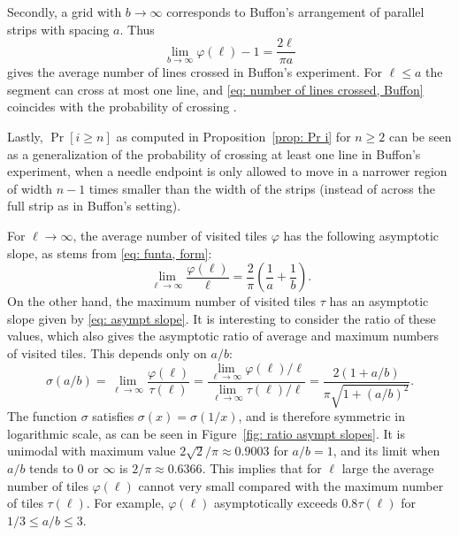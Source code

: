 \documentclass[12pt, a4paper]{article}
\newcommand{\funt}{\tau} %
\newcommand{\funta}{\varphi} %
\newcommand{\ras}{\sigma}
\newcommand{\len}{\ell} %
\begin{document}
Secondly, a grid with $b \rightarrow \infty$ corresponds to Buffon's arrangement of parallel strips with spacing $a$. Thus
\begin{equation}
\label{eq: number of lines crossed, Buffon}
\lim_{b \rightarrow \infty} \funta(\len)-1 = \frac{2\len}{\pi a}
\end{equation}
gives the average number of lines crossed in Buffon's experiment. For $\len \leq a$ the segment can cross at most one line, and \eqref{eq: number of lines crossed, Buffon} coincides with the probability of crossing \cite[section 1.1]{Mathai99}.

Lastly, $\Pr[i \geq n]$ as computed in Proposition~\ref{prop: Pr i} for $n \geq 2$ can be seen as a generalization of the probability of crossing at least one line in Buffon's experiment, when a needle endpoint is only allowed to move in a narrower region of width $n-1$ times smaller than the width of the strips (instead of across the full strip as in Buffon's setting).

For $\len \rightarrow \infty$, the average number of visited tiles $\funta$ has the following asymptotic slope, as stems from \eqref{eq: funta, form}:
\begin{equation}
\label{eq: asympt slope ave}
\lim_{\len \rightarrow \infty} \frac{\funta(\len)}{\len} = \frac 2 \pi \left(\frac 1 a + \frac 1 b \right).
\end{equation}
On the other hand, the maximum number of visited tiles $\funt$ has an asymptotic slope given by \eqref{eq: asympt slope}. It is interesting to consider the ratio of these values, which also gives the asymptotic ratio of average and maximum numbers of visited tiles. This depends only on $a/b$:
\begin{equation}
\label{eq: ras}
\ras(a/b) = \lim_{\len \rightarrow \infty}
\frac { \funta(\len) } { \funt(\len) }
= \frac
{ \lim_{\len \rightarrow \infty} \funta(\len)/\len }
{ \lim_{\len \rightarrow \infty} \funt(\len)/\len }
= \frac{2\left(1 + a/b\right)}{\pi\sqrt{1 + \left(a/b\right)^2}}.
\end{equation}
The function $\ras$ satisfies $\ras(x) = \ras(1/x)$, and is therefore symmetric in logarithmic scale, as can be seen in Figure~\ref{fig: ratio asympt slopes}. It is unimodal with maximum value $2\sqrt 2/\pi \approx 0.9003$ for $a/b=1$, and its limit when $a/b$ tends to $0$ or $\infty$ is $2/\pi \approx 0.6366$. This implies that for $\len$ large the average number of tiles $\funta(\len)$ cannot very small compared with the maximum number of tiles $\funt(\len)$. For example, $\funta(\len)$ asymptotically exceeds $0.8\funt(\len)$ for $1/3 \leq a/b \leq 3$.
\end{document}
